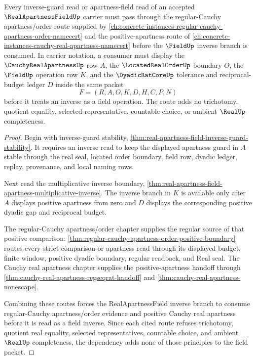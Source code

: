 \begin{theorem}
\label{thm:real-apartness-field-regular-cauchy-apartness-order-dependency}
Every inverse-guard read or apartness-field read of an accepted $\RealApartnessFieldUp$ carrier must pass through the regular-Cauchy apartness/order route supplied by \autoref{ch:concrete-instances-regular-cauchy-apartness-order-namecert} and the positive-apartness route of \autoref{ch:concrete-instances-cauchy-real-apartness-namecert} before the $\FieldUp$ inverse branch is consumed. In carrier notation, a consumer must display the $\CauchyRealApartnessUp$ row $A$, the $\LocatedRealOrderUp$ boundary $O$, the $\FieldUp$ operation row $K$, and the $\DyadicRatCoreUp$ tolerance and reciprocal-budget ledger $D$ inside the same packet
$$
F=(R,A,O,K,D,H,C,P,N)
$$
before it treats an inverse as a field operation. The route adds no trichotomy, quotient equality, selected representative, countable choice, or ambient $\RealUp$ completeness.
\end{theorem}
\begin{proof}
Begin with inverse-guard stability, \autoref{thm:real-apartness-field-inverse-guard-stability}. It requires an inverse read to keep the displayed apartness guard in $A$ stable through the real seal, located order boundary, field row, dyadic ledger, replay, provenance, and local naming rows.

Next read the multiplicative inverse boundary, \autoref{thm:real-apartness-field-apartness-multiplicative-inverse}. The inverse branch in $K$ is available only after $A$ displays positive apartness from zero and $D$ displays the corresponding positive dyadic gap and reciprocal budget.

The regular-Cauchy apartness/order chapter supplies the regular source of that positive comparison: \autoref{thm:regular-cauchy-apartness-order-positive-boundary} routes every strict comparison or apartness read through its displayed budget, finite window, positive dyadic boundary, regular readback, and Real seal. The Cauchy real apartness chapter supplies the positive-apartness handoff through \autoref{thm:cauchy-real-apartness-regseqrat-handoff} and \autoref{thm:cauchy-real-apartness-nonescape}.

Combining these routes forces the RealApartnessField inverse branch to consume regular-Cauchy apartness/order evidence and positive Cauchy real apartness before it is read as a field inverse. Since each cited route refuses trichotomy, quotient real equality, selected representatives, countable choice, and ambient $\RealUp$ completeness, the dependency adds none of those principles to the field packet.
\end{proof}
